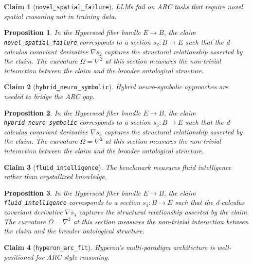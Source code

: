 \documentclass{article}
\newtheorem{claim}{Claim}
\newtheorem{proposition}{Proposition}
\begin{document}
\begin{claim}[\texttt{novel_spatial_failure}]
LLMs fail on ARC tasks that require novel spatial reasoning not in training data.
\end{claim}

\begin{proposition}
In the Hyperseed fiber bundle $E \to B$, the claim \texttt{novel_spatial_failure} corresponds to a section $s_2: B \to E$ such that the d-calculus covariant derivative $\nabla s_2$ captures the structural relationship asserted by the claim. The curvature $\Omega = \nabla^2$ at this section measures the non-trivial interaction between the claim and the broader ontological structure.
\end{proposition}

\begin{claim}[\texttt{hybrid_neuro_symbolic}]
Hybrid neuro-symbolic approaches are needed to bridge the ARC gap.
\end{claim}

\begin{proposition}
In the Hyperseed fiber bundle $E \to B$, the claim \texttt{hybrid_neuro_symbolic} corresponds to a section $s_3: B \to E$ such that the d-calculus covariant derivative $\nabla s_3$ captures the structural relationship asserted by the claim. The curvature $\Omega = \nabla^2$ at this section measures the non-trivial interaction between the claim and the broader ontological structure.
\end{proposition}

\begin{claim}[\texttt{fluid_intelligence}]
The benchmark measures fluid intelligence rather than crystallized knowledge.
\end{claim}

\begin{proposition}
In the Hyperseed fiber bundle $E \to B$, the claim \texttt{fluid_intelligence} corresponds to a section $s_4: B \to E$ such that the d-calculus covariant derivative $\nabla s_4$ captures the structural relationship asserted by the claim. The curvature $\Omega = \nabla^2$ at this section measures the non-trivial interaction between the claim and the broader ontological structure.
\end{proposition}

\begin{claim}[\texttt{hyperon_arc_fit}]
Hyperon's multi-paradigm architecture is well-positioned for ARC-style reasoning.
\end{claim}
\end{document}
